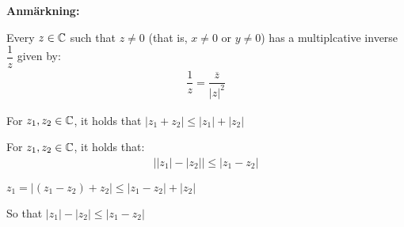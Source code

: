 \par\bigskip
\noindent\textbf{Anmärkning:}\par
\noindent Every $z\in\mathbb{C}$ such that  $z\neq0$ (that is, $x\neq0$ or $y\neq0$) has a multiplcative inverse $\dfrac{1}{z}$ given by:
\begin{equation*}
  \begin{gathered}
    \dfrac{1}{z}= \dfrac{\overline{z}}{\left|z\right|^2}
  \end{gathered}
\end{equation*}
\par\bigskip
\begin{theo}{}
  For $z_1,z_2 \in\mathbb{C}$, it holds that $\left|z_1+z_2\right|\leq \left|z_1\right|+\left|z_2\right|$
\end{theo}
\par\bigskip
\begin{lem}{}
  For $z_1,z_2\in\mathbb{C}$, it holds that:
  \begin{equation*}
    \begin{gathered}
      \left|\left|z_1\right|-\left|z_2\right|\right|\leq \left|z_1-z_2\right|
    \end{gathered}
  \end{equation*}
\end{lem}
\par\bigskip
\begin{prf}[]{}
  $z_1 = \left|(z_1-z_2)+z_2\right|\leq\left|z_1-z_2\right|+\left|z_2\right|$
  \par\bigskip
  \noindent So that $\left|z_1\right|-\left|z_2\right|\leq \left|z_1-z_2\right|$
\end{prf}
\par\bigskip
